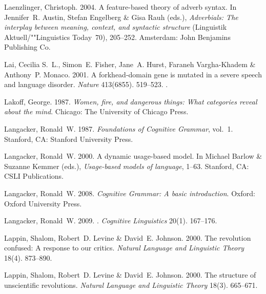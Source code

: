 \begin{thebibliography}{1420}
Laenzlinger, Christoph. 2004.
\newblock A feature-based theory of adverb syntax.
\newblock In Jennifer~R. Austin, Stefan Engelberg \& Gisa Rauh (eds.),
  \emph{Adverbials: {The} interplay between meaning, context, and syntactic
  structure} (Linguistik Aktuell/""Linguistics Today~70), 205--252. Amsterdam:
  John Benjamins Publishing Co.

Lai, Cecilia S.~L., Simon~E. Fisher, Jane~A. Hurst, Faraneh Vargha-Khadem \&
  Anthony~P. Monaco. 2001.
\newblock A forkhead-domain gene is mutated in a severe speech and language
  disorder.
\newblock \emph{Nature} 413(6855). 519--523.
\newblock {}.

Lakoff, George. 1987.
\newblock \emph{Women, fire, and dangerous things: {What} categories reveal
  about the mind}.
\newblock Chicago: The University of Chicago Press.

Langacker, Ronald~W. 1987.
\newblock \emph{Foundations of {Cognitive Grammar}}, vol.~1.
\newblock Stanford, CA: Stanford University Press.

Langacker, Ronald~W. 2000.
\newblock A dynamic usage-based model.
\newblock In Michael Barlow \& Suzanne Kemmer (eds.), \emph{Usage-based models
  of language}, 1--63. Stanford, CA: CSLI Publications.

Langacker, Ronald~W. 2008.
\newblock \emph{{Cognitive Grammar}: {A} basic introduction}.
\newblock Oxford: Oxford University Press.

Langacker, Ronald~W. 2009.
.
\newblock \emph{Cognitive Linguistics} 20(1). 167--176.

Lappin, Shalom, Robert~D. Levine \& David~E. Johnson. 2000{}.
\newblock The revolution confused: {A} response to our critics.
\newblock \emph{Natural Language and Linguistic Theory} 18(4). 873--890.

Lappin, Shalom, Robert~D. Levine \& David~E. Johnson. 2000{}.
\newblock The structure of unscientific revolutions.
\newblock \emph{Natural Language and Linguistic Theory} 18(3). 665--671.


\end{thebibliography}
